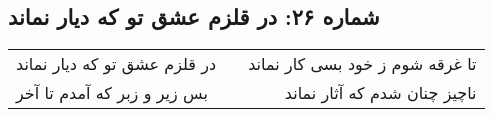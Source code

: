 \begin{center}
\section*{شماره ۲۶: در قلزم عشق تو که دیار نماند}
\label{sec:026}
\begin{longtable}{l p{0.5cm} r}
در قلزم عشق تو که دیار نماند
&&
تا غرقه شوم ز خود بسی کار نماند
\\
بس زیر و زبر که آمدم تا آخر
&&
ناچیز چنان شدم که آثار نماند
\\
\end{longtable}
\end{center}
